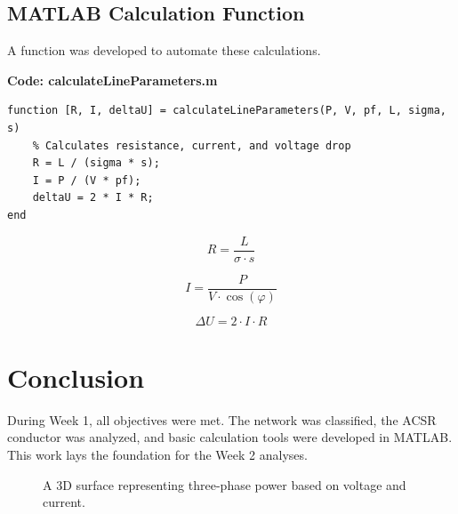 \documentclass[12pt, a4paper]{article}
\begin{document}
\subsection{MATLAB Calculation Function}
A function was developed to automate these calculations.

\textbf{Code: calculateLineParameters.m}
\begin{verbatim}
function [R, I, deltaU] = calculateLineParameters(P, V, pf, L, sigma, s)
    % Calculates resistance, current, and voltage drop
    R = L / (sigma * s);
    I = P / (V * pf);
    deltaU = 2 * I * R;
end
\end{verbatim}

\begin{equation}
    R = \frac{L}{\sigma \cdot s}
\end{equation}

\begin{equation}
    I = \frac{P}{V \cdot \cos(\varphi)}
\end{equation}

\begin{equation}
    \Delta U = 2 \cdot I \cdot R
\end{equation}

\section{Conclusion}
During Week 1, all objectives were met. The network was classified, the ACSR conductor was analyzed, and basic calculation tools were developed in MATLAB. This work lays the foundation for the Week 2 analyses.

\begin{figure}[htbp]
    \centering
    \caption{A 3D surface representing three-phase power based on voltage and current.}
    \label{fig:power_surface}
\end{figure}
\end{document}
